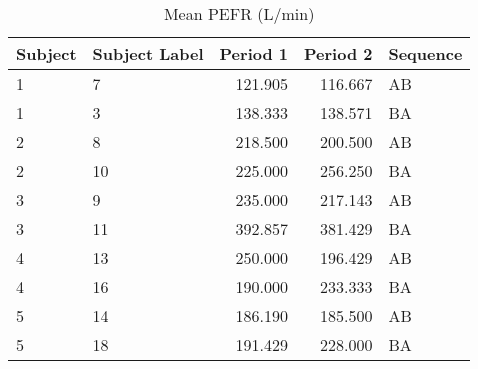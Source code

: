 \begin{table}
\centering
\caption{Mean PEFR (L/min)}
\centering
\begin{tabular}[t]{l|l|r|r|l}
\hline
{Subject} & {Subject Label} & {Period 1} & {Period 2} & Sequence\\
\hline
1 & 7 & 121.905 & 116.667 & AB\\
\hline
1 & 3 & 138.333 & 138.571 & BA\\
\hline
2 & 8 & 218.500 & 200.500 & AB\\
\hline
2 & 10 & 225.000 & 256.250 & BA\\
\hline
3 & 9 & 235.000 & 217.143 & AB\\
\hline
3 & 11 & 392.857 & 381.429 & BA\\
\hline
4 & 13 & 250.000 & 196.429 & AB\\
\hline
4 & 16 & 190.000 & 233.333 & BA\\
\hline
5 & 14 & 186.190 & 185.500 & AB\\
\hline
5 & 18 & 191.429 & 228.000 & BA\\
\hline
\end{tabular}
\label{pefData}
\end{table}
